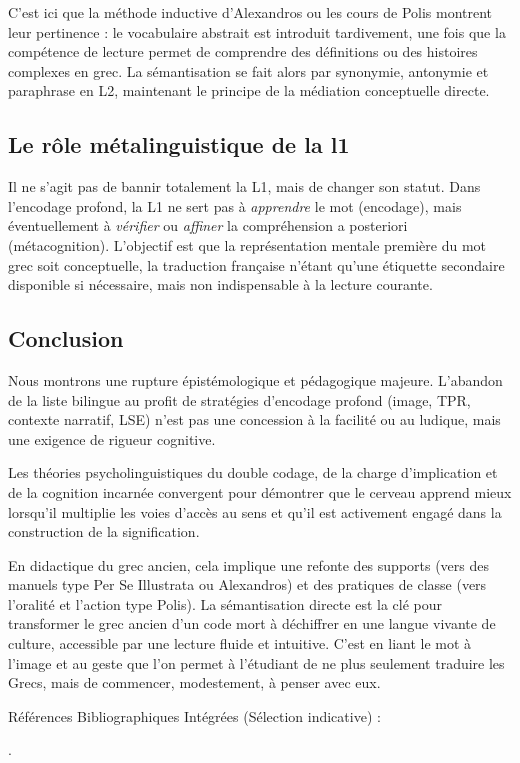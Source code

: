 C'est ici que la méthode inductive d'Alexandros ou les cours de Polis montrent leur pertinence : le
vocabulaire abstrait est introduit tardivement, une fois que la compétence de lecture permet de
comprendre des définitions ou des histoires complexes en grec. La sémantisation se fait alors par
synonymie, antonymie et paraphrase en L2, maintenant le principe de la médiation conceptuelle
directe.\cite{III-1-3-ref57}



\subsection{Le rôle métalinguistique de la l1}

Il ne s'agit pas de bannir totalement la L1, mais de changer son statut. Dans l'encodage profond, la
L1 ne sert pas à \textit{apprendre} le mot (encodage), mais éventuellement à \textit{vérifier} ou
\textit{affiner} la compréhension a posteriori (métacognition). L'objectif est que la représentation
mentale première du mot grec soit conceptuelle, la traduction française n'étant qu'une étiquette
secondaire disponible si nécessaire, mais non indispensable à la lecture
courante.\cite{III-1-3-ref48}



\subsection{Conclusion}

Nous montrons une rupture épistémologique et
pédagogique majeure. L'abandon de la liste bilingue au profit de stratégies d'encodage profond
(image, TPR, contexte narratif, LSE) n'est pas une concession à la facilité ou au ludique, mais une
exigence de rigueur cognitive.

Les théories psycholinguistiques du double codage, de la charge d'implication et de la cognition
incarnée convergent pour démontrer que le cerveau apprend mieux lorsqu'il multiplie les voies
d'accès au sens et qu'il est activement engagé dans la construction de la signification.

En didactique du grec ancien, cela implique une refonte des supports (vers des manuels type Per Se
Illustrata ou Alexandros) et des pratiques de classe (vers l'oralité et l'action type Polis). La
sémantisation directe est la clé pour transformer le grec ancien d'un code mort à déchiffrer en une
langue vivante de culture, accessible par une lecture fluide et intuitive. C'est en liant le mot à
l'image et au geste que l'on permet à l'étudiant de ne plus seulement traduire les Grecs, mais de
commencer, modestement, à penser avec eux.

Références Bibliographiques Intégrées (Sélection indicative) :

.\cite{III-1-3-ref1}

